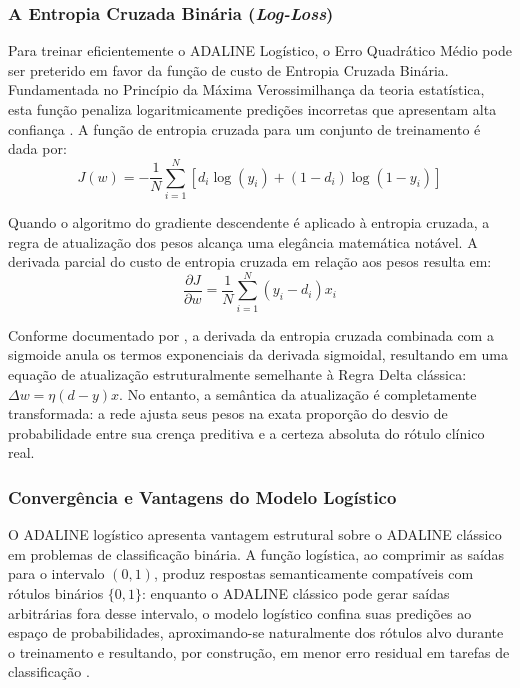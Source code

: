 \subsubsection{A Entropia Cruzada Binária (\textit{Log-Loss})}

Para treinar eficientemente o ADALINE Logístico, o Erro Quadrático Médio pode ser preterido em favor da função de custo de Entropia Cruzada Binária. Fundamentada no Princípio da Máxima Verossimilhança da teoria estatística, esta função penaliza logaritmicamente predições incorretas que apresentam alta confiança \cite{braga2007}. A função de entropia cruzada para um conjunto de treinamento é dada por:
\begin{equation}
J(w) = - \frac{1}{N} \sum_{i=1}^{N} \left[ d_i \log(y_i) + (1 - d_i) \log(1 - y_i) \right]
\end{equation}

Quando o algoritmo do gradiente descendente é aplicado à entropia cruzada, a regra de atualização dos pesos alcança uma elegância matemática notável. A derivada parcial do custo de entropia cruzada em relação aos pesos resulta em:
\begin{equation}
\frac{\partial J}{\partial w} = \frac{1}{N} \sum_{i=1}^{N} (y_i - d_i) x_i
\end{equation}

Conforme documentado por , a derivada da entropia cruzada combinada com a sigmoide anula os termos exponenciais da derivada sigmoidal, resultando em uma equação de atualização estruturalmente semelhante à Regra Delta clássica: $\Delta w = \eta (d - y) x$. No entanto, a semântica da atualização é completamente transformada: a rede ajusta seus pesos na exata proporção do desvio de probabilidade entre sua crença preditiva e a certeza absoluta do rótulo clínico real.

\subsubsection{Convergência e Vantagens do Modelo Logístico}

O ADALINE logístico apresenta vantagem estrutural sobre o ADALINE clássico em problemas de classificação binária. A função logística, ao comprimir as saídas para o intervalo $(0,1)$, produz respostas semanticamente compatíveis com rótulos binários $\{0,1\}$: enquanto o ADALINE clássico pode gerar saídas arbitrárias fora desse intervalo, o modelo logístico confina suas predições ao espaço de probabilidades, aproximando-se naturalmente dos rótulos alvo durante o treinamento e resultando, por construção, em menor erro residual em tarefas de classificação \cite{abdi1994,abdi2006}.

